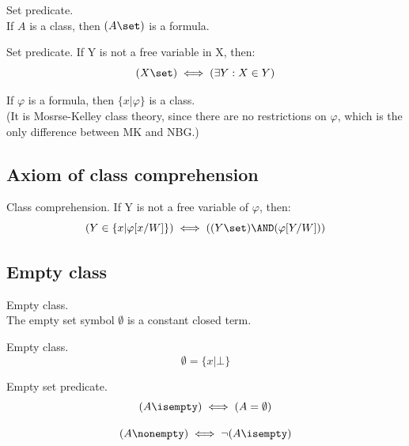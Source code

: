 \begin{constructor} Set predicate.\\
If $A$ is a class, then $(A\set)$ is a formula.
\end{constructor}
\begin{definition} Set predicate.
If Y is not a free variable in X, then:
\[
(X\set)\iff(\exists Y:X\in Y)
\]
\end{definition}


\begin{constructor}
If $\varphi$ is a formula, then $\{x|\varphi\}$ is a class.\\
(It is Mosrse-Kelley class theory, since there are no restrictions on $\varphi$, which is the only difference between MK and NBG.)
\end{constructor}
\subsection{Axiom of class comprehension}
\begin{axiom}
\label{axm:comprehension}
Class comprehension.
If Y is not a free variable of $\varphi$, then:
\[
(Y\in\{x|\varphi[x/W]\}) \iff ((Y\set)\AND(\varphi[Y/W]))
\]
\end{axiom}

\subsection{Empty class}
\begin{constructor} Empty class.\\
The empty set symbol $\emptyset$ is a constant closed term.
\end{constructor}
\begin{definition}
\label{def:empty class}
Empty class.
\[
\emptyset = \{x|\bot\}
\]
\end{definition}

\begin{definition} Empty set predicate.
\label{def:empty}
\[
(A\isempty)\iff (A=\emptyset)
\]
\end{definition}

\begin{definition}
\label{def:nonempty}
\[
(A\nonempty)\iff \neg(A\isempty)
\]
\end{definition}



